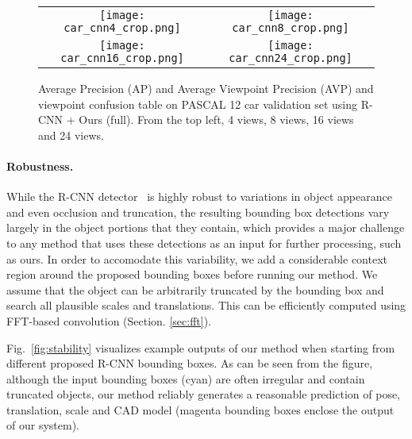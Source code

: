 \begin{figure}[h]
\setlength\tabcolsep{1pt}
\centering
\begin{tabular}{cc}
  \texttt{[image: car\_cnn4\_crop.png]} &   
  \texttt{[image: car\_cnn8\_crop.png]} \\   
  \texttt{[image: car\_cnn16\_crop.png]} &   
  \texttt{[image: car\_cnn24\_crop.png]} \\   
\end{tabular}
\caption{Average Precision (AP) and Average Viewpoint Precision (AVP)
  and viewpoint confusion table on PASCAL 12 car validation set using
  R-CNN + Ours (full). From the top left, 4 views, 8 views, 16 views
  and 24 views.}
  \label{fig:car_cnn_ap}
\end{figure}

\paragraph{Robustness.}
While the R-CNN detector~\cite{Girshick14} is highly robust to
variations in object appearance and even occlusion and truncation,
the resulting bounding box detections vary largely in the object
portions that they contain, which provides a major challenge to any
method that uses these detections as an input for further processing,
such as ours.
%
In order to accomodate this variability, we add a considerable context
region around the proposed bounding boxes before running our method.
We assume that the object can be arbitrarily truncated by the bounding
box and search all plausible scales and translations. This can be
efficiently computed using FFT-based convolution
(Section. \ref{sec:fft}).

Fig.~\ref{fig:stability} visualizes example outputs of our method when
starting from different proposed R-CNN bounding boxes. As can be seen
from the figure, although the input bounding boxes (cyan) are often
irregular and contain truncated objects, our method reliably
generates a reasonable prediction of pose, translation, scale and CAD
model (magenta bounding boxes enclose the output of our system).

